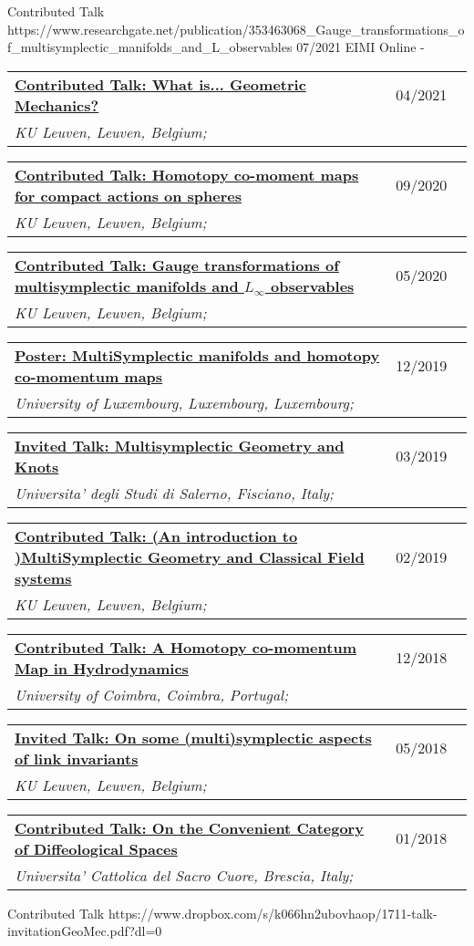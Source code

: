 \documentclass[a4paper]{article}
\newcommand{\longvoice}[8]{
	\begin{tabular}{p{0.83\linewidth} p{0.17\linewidth} }
		\textbf{\href{#3}{#2: #1}} & #4 
		\\ 
		\textit{#5, #6, #7;} & {\small\emph{#8}}
	\end{tabular}
	\vspace{.5em}
}
\begin{document}
		{Contributed Talk}
		{https://www.researchgate.net/publication/353463068_Gauge_transformations_of_multisymplectic_manifolds_and_L_observables}
		{07/2021}
		{EIMI}
		{Online}
		{-}
		{}
	\longvoice{What is... Geometric Mechanics?}
		{Contributed Talk}
		{https://wis.kuleuven.be/agenda/PhdColloquia/ay20-21/copy4_of_PhD-coll-Molag}
		{04/2021}
		{KU Leuven}
		{Leuven}
		{Belgium}
		{}
	\longvoice{Homotopy co-moment maps for compact actions on spheres}
		{Contributed Talk}
		{https://www.researchgate.net/publication/344220375_Homotopy_co-moment_maps_for_compact_actions_on_spheres}
		{09/2020}
		{KU Leuven}
		{Leuven}
		{Belgium}
		{}
	\longvoice{Gauge transformations of multisymplectic manifolds and $L_\infty$ observables}
		{Contributed Talk}
		{https://www.researchgate.net/publication/344044689_Gauge_transformations_of_multisymplectic_manifolds_and_L_infinity_observables}
		{05/2020}
		{KU Leuven}
		{Leuven}
		{Belgium}
		{}
	\longvoice{MultiSymplectic manifolds and homotopy co-momentum maps}
		{Poster}
		{https://www.researchgate.net/publication/338019063_Multisymplectic_manifolds_and_Homotopy_co-momentum_maps}
		{12/2019}
		{University of Luxembourg}
		{Luxembourg}
		{Luxembourg}
		{}
	\longvoice{Multisymplectic Geometry and Knots}
		{Invited Talk}
		{https://www.researchgate.net/publication/331939491_Multisymplectic_aspects_of_link_invariants}
		{03/2019}
		{Universita' degli Studi di Salerno}
		{Fisciano}
		{Italy}
		{}
	\longvoice{(An introduction to )MultiSymplectic Geometry and Classical Field systems}
		{Contributed Talk}
		{https://www.dropbox.com/s/q68uv6hbbej8d09/1902-Talk-MultisymplecticFields.pdf?dl=0}
		{02/2019}
		{KU Leuven}
		{Leuven}
		{Belgium}
		{}
	\longvoice{A Homotopy co-momentum Map in Hydrodynamics}
		{Contributed Talk}
		{https://www.researchgate.net/publication/329572409_Homotopy_co-momentum_Map_in_Hydrodynamics}
		{12/2018}
		{University of Coimbra}
		{Coimbra}
		{Portugal}
		{}
	\longvoice{On some (multi)symplectic aspects of link invariants}
		{Invited Talk}
		{https://web.archive.org/web/20180424133109/https://wis.kuleuven.be/agenda/sem-geometry/academic-year-2017-2018/seminar_differential_geometry_Miti}
		{05/2018}
		{KU Leuven}
		{Leuven}
		{Belgium}
		{}
	\longvoice{On the Convenient Category of Diffeological Spaces}
		{Contributed Talk}
		{https://www.dropbox.com/s/thm6unntpduynh3/1801-Talk-ConvenientDiffeological.pdf?dl=0}
		{01/2018}
		{Universita' Cattolica del Sacro Cuore}
		{Brescia}
		{Italy}
		{}
		{Contributed Talk}
		{https://www.dropbox.com/s/k066hn2ubovhaop/1711-talk-invitationGeoMec.pdf?dl=0}
\end{document}
